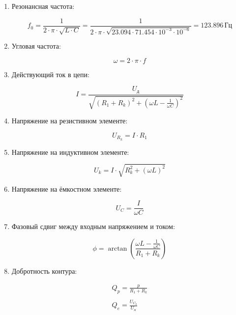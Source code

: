 \begin{enumerate}
	\item Резонансная частота:

	      \[
		      f_0 = \frac{1}{2 \cdot \pi \cdot \sqrt{L \cdot C}} = \frac{1}{2 \cdot \pi \cdot \sqrt{23.094 \cdot 71.454 \cdot 10^{-3} \cdot 10^{-6}}} = 123.896 \, \text{Гц}
	      \]

	\item Угловая частота:

	      \[
		      \omega = 2 \cdot \pi \cdot f
	      \]

	\item Действующий ток в цепи:

	      \[
		      I = \frac{U_\text{д}}{\sqrt{(R_1+R_k)^2+(\omega L - \frac{1}{\omega C})^2}}
	      \]
	\item Напряжение на резистивном элементе:

	      \[
		      U_{R_k} = I \cdot R_1
	      \]

	\item Напряжение на индуктивном элементе:

	      \[
		      U_k = I \cdot \sqrt{R_k^2 + (\omega L)^2}
	      \]

	\item Напряжение на ёмкостном элементе:

	      \[
		      U_C = \frac{I}{\omega C}
	      \]

	\item Фазовый сдвиг между входным напряжением и током:

	      \[
		      \phi = \arctan \left(\frac{\omega L - \frac{1}{\omega C}}{R_1 + R_k}\right)
	      \]

	\item Добротность контура:

	      \[
		      \begin{gathered}
			      Q_p = \frac{p}{R_1+R_k} \\
			      \\
			      Q_e = \frac{U_{C_0}}{U_{\text{д}}}
		      \end{gathered}
	      \]

\end{enumerate}
